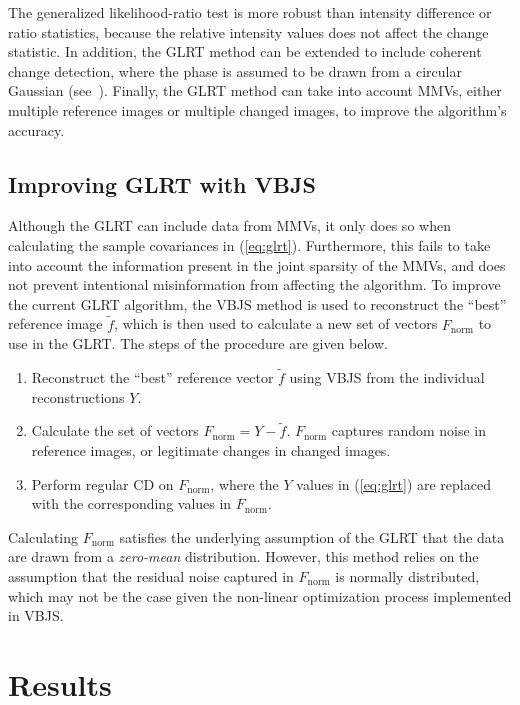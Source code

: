 \documentclass{article}
\begin{document}
The generalized likelihood-ratio test is more robust than intensity difference or ratio statistics, because the relative intensity values does not affect the change statistic. In addition, the GLRT method can be extended to include coherent change detection, where the phase is assumed to be drawn from a circular Gaussian (see~\cite{Ash_2014}). Finally, the GLRT method can take into account MMVs, either multiple reference images or multiple changed images, to improve the algorithm's accuracy.

\subsection{Improving GLRT with VBJS}

Although the GLRT can include data from MMVs, it only does so when calculating the sample covariances in (\ref{eq:glrt}). Furthermore, this fails to take into account the information present in the joint sparsity of the MMVs, and does not prevent intentional misinformation from affecting the algorithm. To improve the current GLRT algorithm, the VBJS method is used to reconstruct the ``best'' reference image $\tilde{f}$, which is then used to calculate a new set of vectors $F_\text{norm}$ to use in the GLRT. The steps of the procedure are given below.

\begin{enumerate}
    \item Reconstruct the ``best'' reference vector $\tilde{f}$ using VBJS from the individual reconstructions $Y$.
    \item Calculate the set of vectors $F_\text{norm} = Y - \tilde{f}$. $F_\text{norm}$ captures random noise in reference images, or legitimate changes in changed images.
    \item Perform regular CD on $F_\text{norm}$, where the $Y$ values in (\ref{eq:glrt}) are replaced with the corresponding values in $F_\text{norm}$.
\end{enumerate}

Calculating $F_\text{norm}$ satisfies the underlying assumption of the GLRT that the data are drawn from a \emph{zero-mean} distribution. However, this method relies on the assumption that the residual noise captured in $F_\text{norm}$ is normally distributed, which may not be the case given the non-linear optimization process implemented in VBJS.

\section{Results}
\end{document}
